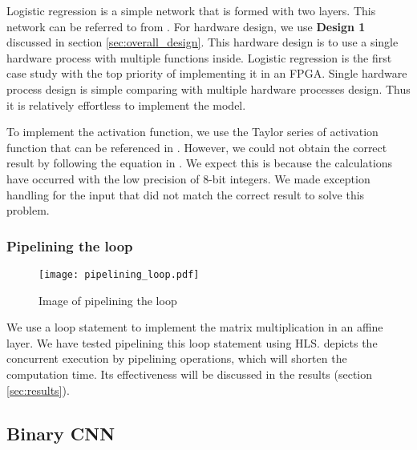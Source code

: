 Logistic regression is a simple network that is formed with two layers. This network can be referred to from . For hardware design, we use \textbf{Design 1} discussed in section \ref{sec:overall_design}. This hardware design is to use a single hardware process with multiple functions inside. Logistic regression is the first case study with the top priority of implementing it in an FPGA. Single hardware process design is simple comparing with multiple hardware processes design. Thus it is relatively effortless to implement the model.

To implement the activation function, we use the Taylor series of activation function that can be referenced in \cite{ccetin2015application}. However, we could not obtain the correct result by following the equation in \cite{ccetin2015application}. We expect this is because the calculations have occurred with the low precision of 8-bit integers. We made exception handling for the input that did not match the correct result to solve this problem.


\subsubsection{Pipelining the loop}

\begin{figure}[tbp]
  \centering
  \texttt{[image: pipelining\_loop.pdf]}
  \caption{Image of pipelining the loop}%
  \label{fig:pipelining_loop}
\end{figure}

We use a loop statement to implement the matrix multiplication in an affine layer. We have tested pipelining this loop statement using HLS.  depicts the concurrent execution by pipelining operations, which will shorten the computation time. Its effectiveness will be discussed in the results (section \ref{sec:results}).


\subsection{Binary CNN}\label{sec:binarycnn}

